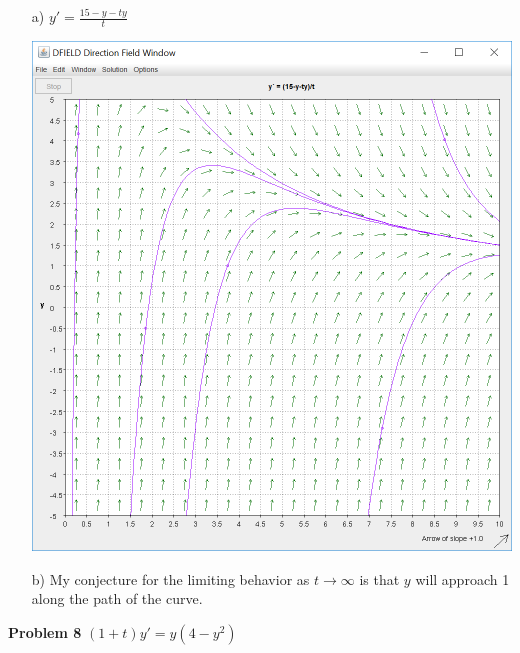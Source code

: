 \documentclass[10pt]{article}
\begin{document}
            \begin{enumerate}
                \item[a)] $y'=\frac{15-y-ty}{t}$ \begin{center}\includegraphics[scale=0.5]{lab1p3p7.PNG}\end{center}
                \item[b)] My conjecture for the limiting behavior as $t \rightarrow \infty$ is that $y$ will approach 1 along the path of the curve.
            \end{enumerate}
        {\bf Problem 8} $(1+t)y'=y(4-y^2)$
\end{document}
